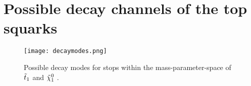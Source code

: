 \section{Possible decay channels of the top squarks} \label{sec:stopDecay}





\begin{figure}[htbp]
    \centering
    \texttt{[image: decaymodes.png]}
    \caption{Possible decay modes for stops within the mass-parameter-space of $\Tilde{t}_1 $ and $ \Tilde{\chi}_1^0 $ \cite{aad2014search}.}
    \label{fig:decayMode}
\end{figure}